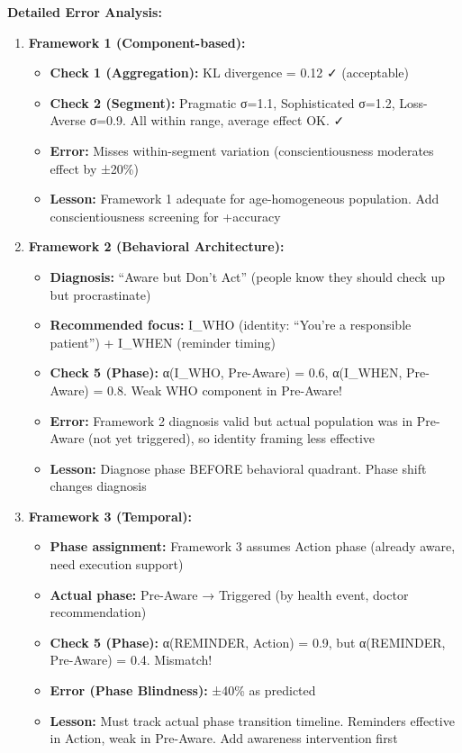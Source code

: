 \textbf{Detailed Error Analysis:}

\begin{enumerate}
\item \textbf{Framework 1 (Component-based):}
  \begin{itemize}[nosep]
  \item \textbf{Check 1 (Aggregation):} KL divergence = 0.12 ✓ (acceptable)
  \item \textbf{Check 2 (Segment):} Pragmatic σ=1.1, Sophisticated σ=1.2, Loss-Averse σ=0.9. All within range, average effect OK. ✓
  \item \textbf{Error:} Misses within-segment variation (conscientiousness moderates effect by ±20\%)
  \item \textbf{Lesson:} Framework 1 adequate for age-homogeneous population. Add conscientiousness screening for +accuracy
  \end{itemize}

\item \textbf{Framework 2 (Behavioral Architecture):}
  \begin{itemize}[nosep]
  \item \textbf{Diagnosis:} ``Aware but Don't Act'' (people know they should check up but procrastinate)
  \item \textbf{Recommended focus:} I\_WHO (identity: ``You're a responsible patient'') + I\_WHEN (reminder timing)
  \item \textbf{Check 5 (Phase):} α(I\_WHO, Pre-Aware) = 0.6, α(I\_WHEN, Pre-Aware) = 0.8. Weak WHO component in Pre-Aware!
  \item \textbf{Error:} Framework 2 diagnosis valid but actual population was in Pre-Aware (not yet triggered), so identity framing less effective
  \item \textbf{Lesson:} Diagnose phase BEFORE behavioral quadrant. Phase shift changes diagnosis
  \end{itemize}

\item \textbf{Framework 3 (Temporal):}
  \begin{itemize}[nosep]
  \item \textbf{Phase assignment:} Framework 3 assumes Action phase (already aware, need execution support)
  \item \textbf{Actual phase:} Pre-Aware → Triggered (by health event, doctor recommendation)
  \item \textbf{Check 5 (Phase):} α(REMINDER, Action) = 0.9, but α(REMINDER, Pre-Aware) = 0.4. Mismatch!
  \item \textbf{Error (Phase Blindness):} ±40\% as predicted
  \item \textbf{Lesson:} Must track actual phase transition timeline. Reminders effective in Action, weak in Pre-Aware. Add awareness intervention first
  \end{itemize}


\end{enumerate}
